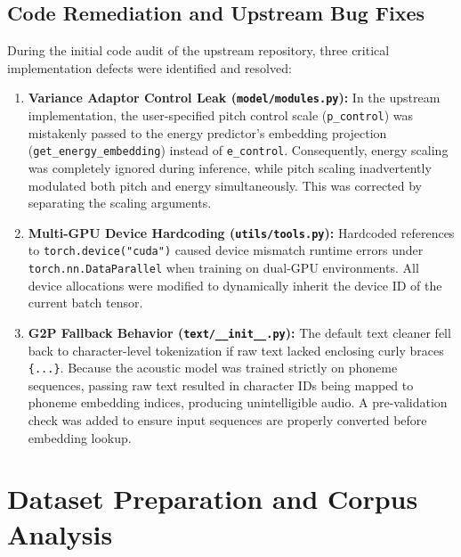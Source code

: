 \documentclass[11pt,a4paper]{article}
\begin{document}
\subsection{Code Remediation and Upstream Bug Fixes}
During the initial code audit of the upstream repository, three critical implementation defects were identified and resolved:
\begin{enumerate}
    \item \textbf{Variance Adaptor Control Leak (\texttt{model/modules.py}):} In the upstream implementation, the user-specified pitch control scale (\texttt{p\_control}) was mistakenly passed to the energy predictor's embedding projection (\texttt{get\_energy\_embedding}) instead of \texttt{e\_control}. Consequently, energy scaling was completely ignored during inference, while pitch scaling inadvertently modulated both pitch and energy simultaneously. This was corrected by separating the scaling arguments.
    \item \textbf{Multi-GPU Device Hardcoding (\texttt{utils/tools.py}):} Hardcoded references to \texttt{torch.device("cuda")} caused device mismatch runtime errors under \texttt{torch.nn.DataParallel} when training on dual-GPU environments. All device allocations were modified to dynamically inherit the device ID of the current batch tensor.
    \item \textbf{G2P Fallback Behavior (\texttt{text/\_\_init\_\_.py}):} The default text cleaner fell back to character-level tokenization if raw text lacked enclosing curly braces \texttt{\{...\}}. Because the acoustic model was trained strictly on phoneme sequences, passing raw text resulted in character IDs being mapped to phoneme embedding indices, producing unintelligible audio. A pre-validation check was added to ensure input sequences are properly converted before embedding lookup.
\end{enumerate}

\section{Dataset Preparation and Corpus Analysis}
\end{document}
